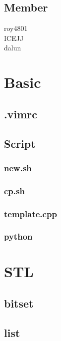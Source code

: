 
\subsection{Member}
roy4801 \\
ICEJJ \\
dalun
\section{Basic}

\subsection{.vimrc}


\subsection{Script}
\subsubsection{new.sh}


\subsubsection{cp.sh}


\subsubsection{template.cpp}


\subsubsection{python}


\section{STL}

\subsection{bitset}


\subsection{list}


